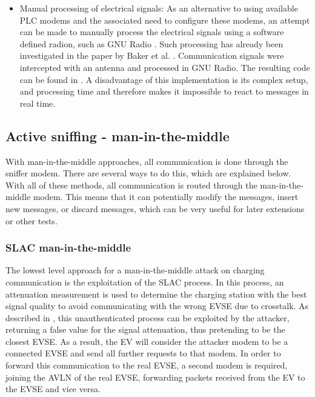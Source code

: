 \documentclass[sigconf]{acmart}
\begin{document}
\begin{itemize}
    \item Manual processing of electrical signals: As an alternative to using available PLC modems and the associated need to configure these modems, an attempt can be made to manually process the electrical signals using a software defined radion, such as GNU Radio \citep{gnuradio}. Such processing has already been investigated in the paper by Baker et al. \citep{baker-losing-2019}. Communication signals were intercepted with an antenna and processed in GNU Radio. The resulting code can be found in \citep{baker-rb-2022}. A disadvantage of this implementation is its complex setup, and processing time and therefore makes it impossible to react to messages in real time.
\end{itemize}

\subsection{Active sniffing - man-in-the-middle}
With man-in-the-middle approaches, all communication is done through the sniffer modem. There are several ways to do this, which are explained below. With all of these methods, all communication is routed through the man-in-the-middle modem. This means that it can potentially modify the messages, insert new messages, or discard messages, which can be very useful for later extensions or other tests.

\subsubsection{SLAC man-in-the-middle}
\label{sec:slac-mitm}
The lowest level approach for a man-in-the-middle attack on charging communication is the exploitation of the SLAC process.
In this process, an attenuation measurement is used to determine the charging station with the best signal quality to avoid communicating with the wrong EVSE due to crosstalk.
As described in \citep[pp.\,8--9]{bao_threat_2018}, this unauthenticated process can be exploited by the attacker, returning a false value for the signal attenuation, thus pretending to be the closest EVSE.
As a result, the EV will consider the attacker modem to be a connected EVSE and send all further requests to that modem.
In order to forward this communication to the real EVSE, a second modem is required, joining the AVLN of the real EVSE, forwarding packets received from the EV to the EVSE and vice versa.
\end{document}
